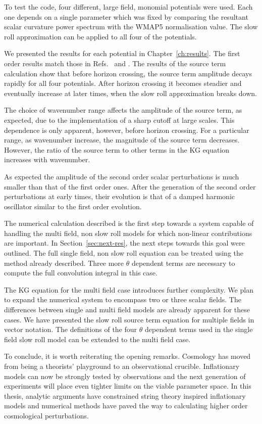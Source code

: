 To test the code, four different, large field, monomial potentials were used. Each
one depends on a single parameter which was fixed by comparing the resultant scalar
curvature power spectrum with the WMAP5 normalisation value. The slow roll
approximation can be applied to all four of the potentials.

We presented the results for each potential in Chapter~\ref{ch:results}. The first
order results match those in Refs.~\cite{Martin:2006rs, Ringeval:2007am} and
\cite{Salopek:1988qh}. The results of the source term calculation show that before
horizon crossing, the source term amplitude decays rapidly for all four potentials.
After horizon crossing it becomes steadier and eventually increase at later times,
when the slow roll approximation breaks down.

The choice of wavenumber range affects the amplitude of the source term, as
expected, due to the implementation of a sharp cutoff at large scales. This
dependence is only apparent, however, before horizon crossing. For a particular
range, as wavenumber increase, the magnitude of the source term decreases. However,
the ratio of the source term to other terms in the KG equation increases with
wavenumber. 

As expected the amplitude of the second order scalar perturbations is much smaller
than that of the first order ones. After the generation of the second order
perturbations at early times, their evolution is that of a damped harmonic
oscillator similar to the first order evolution.


The numerical calculation described is the first step towards a system capable of
handling the multi field, non slow roll models for which non-linear contributions
are important. In Section~\ref{sec:next-res}, the next steps towards this goal were
outlined. The full single field, non slow roll equation can be treated using the
method already described. Three more $\theta$ dependent terms are necessary to
compute the full convolution integral in this case. 

The KG equation for the multi field case introduces further complexity. We plan to
expand the numerical system to encompass two or three scalar fields. The differences
between single and multi field models are already apparent for these cases. We have
presented the slow roll source term equation for multiple fields in vector notation.
The definitions of the four $\theta$ dependent terms used in the single
field slow roll model can be extended to the multi field case. 


To conclude, it is worth reiterating the opening remarks. Cosmology has moved from
being a theorists' playground to an observational crucible. Inflationary models can
now be strongly tested by observations and the next generation of experiments will
place even tighter limits on the viable parameter space. In this thesis, analytic
arguments have constrained string theory inspired inflationary models and numerical
methods have paved the way to calculating higher order cosmological perturbations.
